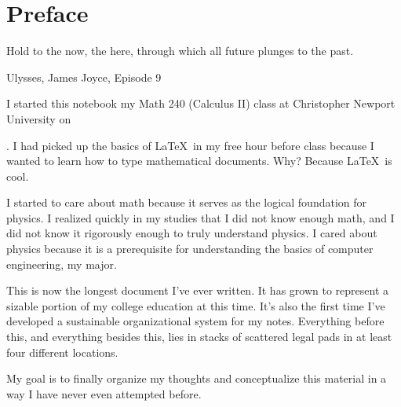 \chapter*{Preface}\epigraph{
  Hold to the now, the here, through which all future plunges to the
  past.
}
{Ulysses, James Joyce, Episode 9}

I started this notebook my Math 240 (Calculus II) class at Christopher Newport
University on \date{February 13, 2012}. I had picked up the basics of \LaTeX\ in my free hour
before class because I wanted to learn how to type mathematical documents. Why?
Because \LaTeX\ is cool.

I started to care about math because it serves as the logical foundation for
physics. I realized quickly in my studies that I did not know enough math, and I
did not know it rigorously enough to truly understand physics. I cared about
physics because it is a prerequisite for understanding the basics of computer
engineering, my major.


This is now the longest document I've ever written. It has grown to represent
a sizable portion of my college education at this time. It's also the first time I've
developed a sustainable organizational system for my notes. Everything before
this, and everything besides this, lies in stacks of scattered legal pads in at
least four different locations.

My goal is to finally organize my thoughts and conceptualize this material in a
way I have never even attempted before.

